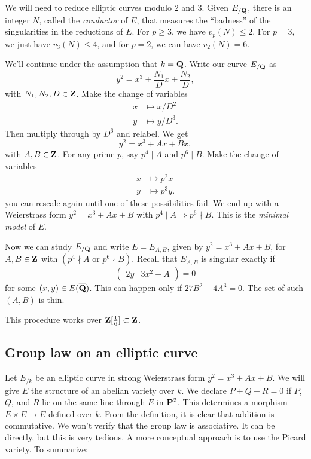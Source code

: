 We will need to reduce elliptic curves modulo $2$ and $3$. 
Given $E_{/\mathbf{Q}}$, there is an integer $N$, called the \emph{conductor} of $E$, 
that measures the ``badness'' of the singularities in the reductions of $E$. 
For $p\geqslant 3$, we have $v_p(N)\leqslant 2$. For 
$p=3$, we just have $v_3(N)\leqslant 4$, and for $p=2$, we can have 
$v_2(N)=6$. 

We'll continue under the assumption that $k=\mathbf{Q}$. Write our curve 
$E_{/\mathbf{Q}}$ as 
\[
  y^2=x^3 + \frac{N_1}{D} x + \frac{N_2}{D} ,
\]
with $N_1,N_2,D\in \mathbf{Z}$. Make the change of variables 
\begin{align*}
  x &\mapsto x/D^2 \\ 
  y &\mapsto y/D^3 .
\end{align*}
Then multiply through by $D^6$ and relabel. We get 
\[
  y^2=x^3+ A x+ B x ,
\]
with $A,B\in \mathbf{Z}$. For any prime $p$, say 
$p^4\mid A$ and $p^6\mid B$. Make the change of variables
\begin{align*}
  x &\mapsto p^2 x \\ 
  y &\mapsto p^3 y .
\end{align*}
you can rescale again until one of these possibilities fail. We end up with 
a Weierstrass form $y^2=x^3+A x+B$ with $p^4\mid A\Rightarrow p^6\nmid B$. This 
is the \emph{minimal model} of $E$. 

Now we can study $E_{/\mathbf{Q}}$ and write $E=E_{A,B}$, given by $y^2=x^3+A x+B$, 
for $A,B\in \mathbf{Z}$ with $(p^4\nmid A\text{ or }p^6\nmid B)$. Recall that 
$E_{A,B}$ is singular exactly if 
\[
  \begin{pmatrix} 2 y & 3 x^2+A\end{pmatrix} = 0
\]
for some $(x,y)\in E(\overline{\mathbf{Q}})$. This can happen only if 
$27 B^2+4 A^3=0$. The set of such $(A,B)$ is thin. 

This procedure works over $\mathbf{Z}[\frac 1 6]\subset \mathbf{Z}$. 





\subsection{Group law on an elliptic curve}

Let $E_{/k}$ be an elliptic curve in strong Weierstrass form 
$y^2=x^3+A x+B$. We will give $E$ the structure of an abelian 
variety over $k$. We declare $P+Q+R=0$ if $P$, $Q$, and $R$ lie on the same 
line through $E$ in $\mathbf{P}^2$. This determines a morphism 
$E\times E\to E$ defined over $k$. From the definition, it is clear that 
addition is commutative. We won't verify that the group law is associative. 
It can be directly, but this is very tedious. A more conceptual approach is to 
use the Picard variety. To summarize: 

